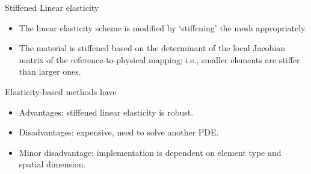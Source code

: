 \documentclass[t,12pt]{beamer}
\begin{document}
\begin{frame}{Stiffened Linear elasticity}
	\begin{itemize}
	\item The linear elasticity scheme is modified by `stiffening' the mesh appropriately. 
	\item The material is stiffened based on the determinant of the local Jacobian matrix of the reference-to-physical mapping; i.e., smaller elements are stiffer than larger ones.
	\end{itemize}
Elasticity-based methods have
\begin{itemize}
	\item Advantages: stiffened linear elasticity is robust.
	\item Disadvantages: expensive, need to solve another PDE.
	\item Minor disadvantage: implementation is dependent on element type and spatial dimension.
\end{itemize}
\end{frame}
\end{document}
